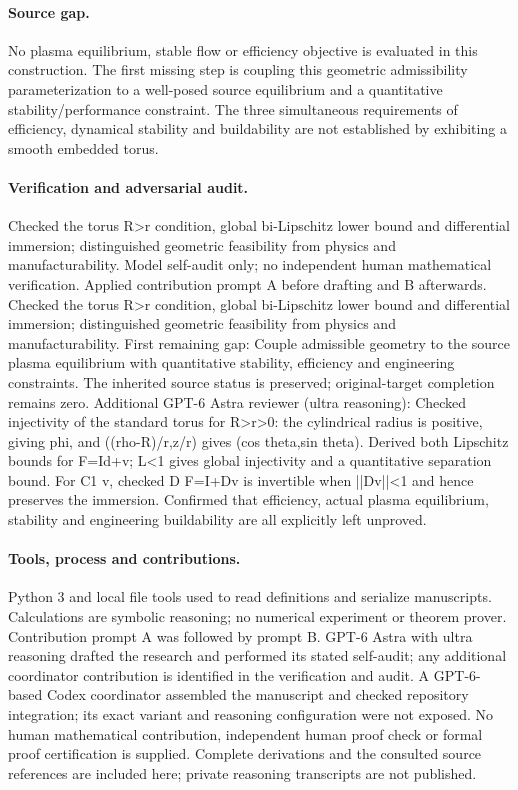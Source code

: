 \documentclass[11pt]{article}
\begin{document}
\paragraph{Source gap.} No plasma equilibrium, stable flow or efficiency objective is evaluated in this construction. The first missing step is coupling this geometric admissibility parameterization to a well-posed source equilibrium and a quantitative stability/performance constraint. The three simultaneous requirements of efficiency, dynamical stability and buildability are not established by exhibiting a smooth embedded torus.

\paragraph{Verification and adversarial audit.}
Checked the torus R>r condition, global bi-Lipschitz lower bound and differential immersion; distinguished geometric feasibility from physics and manufacturability. Model self-audit only; no independent human mathematical verification. Applied contribution prompt A before drafting and B afterwards. Checked the torus R>r condition, global bi-Lipschitz lower bound and differential immersion; distinguished geometric feasibility from physics and manufacturability. First remaining gap: Couple admissible geometry to the source plasma equilibrium with quantitative stability, efficiency and engineering constraints. The inherited source status is preserved; original-target completion remains zero. Additional GPT-6 Astra reviewer (ultra reasoning): Checked injectivity of the standard torus for R>r>0: the cylindrical radius is positive, giving phi, and ((rho-R)/r,z/r) gives (cos theta,sin theta). Derived both Lipschitz bounds for F=Id+v; L<1 gives global injectivity and a quantitative separation bound. For C1 v, checked D F=I+Dv is invertible when ||Dv||<1 and hence preserves the immersion. Confirmed that efficiency, actual plasma equilibrium, stability and engineering buildability are all explicitly left unproved.

\paragraph{Tools, process and contributions.}
Python 3 and local file tools used to read definitions and serialize manuscripts. Calculations are symbolic reasoning; no numerical experiment or theorem prover. Contribution prompt A was followed by prompt B. GPT-6 Astra with ultra reasoning drafted the research and performed its stated self-audit; any additional coordinator contribution is identified in the verification and audit. A GPT-6-based Codex coordinator assembled the manuscript and checked repository integration; its exact variant and reasoning configuration were not exposed. No human mathematical contribution, independent human proof check or formal proof certification is supplied. Complete derivations and the consulted source references are included here; private reasoning transcripts are not published.
\end{document}
